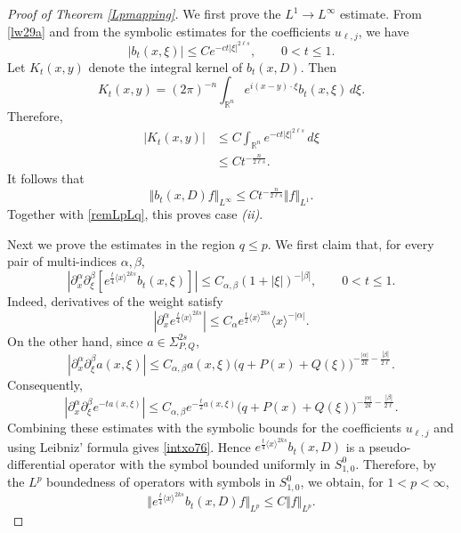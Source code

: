 \documentclass[12pt, reqno]{amsart}
\theoremstyle{definition}
\theoremstyle{remark}
\numberwithin{equation}{section}
\begin{document}
\begin{proof}[Proof of Theorem \ref{Lpmapping}]
We first prove the $L^1\to L^\infty$ estimate. From \eqref{lw29a} and from the symbolic estimates for the coefficients $u_{\ell,j}$, we have
\[
    |b_t(x,\xi)|
    \leq
    C e^{-c t|\xi|^{2\ell s}},
    \qquad 0<t\leq1.
\]
Let $K_t(x,y)$ denote the integral kernel of $b_t(x,D)$. Then
\[
    K_t(x,y)
    =
    (2\pi)^{-n}
    \int_{\mathbb R^n}
    e^{i(x-y)\cdot\xi}
    b_t(x,\xi)\,d\xi .
\]
Therefore,
\[
\begin{aligned}
    |K_t(x,y)|
    &\leq
    C\int_{\mathbb R^n}
    e^{-c t|\xi|^{2\ell s}}\,d\xi          \\
    &\leq
    C t^{-\frac{n}{2\ell s}}.
\end{aligned}
\]
It follows that
\begin{equation}
\label{L1Linf}
    \Vert b_t(x,D)f\Vert_{L^\infty}
    \leq
    C t^{-\frac{n}{2\ell s}}
    \Vert f\Vert_{L^1}.
\end{equation}
Together with \eqref{remLpLq}, this proves case {\it (ii)}.

Next we prove the estimates in the region $q\leq p$. We first claim that, for every pair of multi-indices $\alpha,\beta$,
\begin{equation}
\label{intxo76}
    \left|
    \partial_x^\alpha\partial_\xi^\beta
    \left[
    e^{\frac{t}{4}\langle x\rangle^{2k s}}
    b_t(x,\xi)
    \right]
    \right|
    \leq
    C_{\alpha,\beta}
    (1+|\xi|)^{-|\beta|},
    \qquad 0<t\leq1.
\end{equation}
Indeed, derivatives of the weight satisfy
\[
    \left|
    \partial_x^\alpha
    e^{\frac{t}{4}\langle x\rangle^{2k s}}
    \right|
    \leq
    C_\alpha
    e^{\frac{t}{2}\langle x\rangle^{2k s}}
    \langle x\rangle^{-|\alpha|}.
\]
On the other hand, since $a\in\Sigma_{P,Q}^{2s}$,
\[
    \left|
    \partial_x^\alpha\partial_\xi^\beta a(x,\xi)
    \right|
    \leq
    C_{\alpha,\beta}
    a(x,\xi)
    \big(q+P(x)+Q(\xi)\big)^{
    -\frac{|\alpha|}{2k}
    -\frac{|\beta|}{2\ell}} .
\]
Consequently,
\[
    \left|
    \partial_x^\alpha\partial_\xi^\beta
    e^{-t a(x,\xi)}
    \right|
    \leq
    C_{\alpha,\beta}
    e^{-\frac t2 a(x,\xi)}
    \big(q+P(x)+Q(\xi)\big)^{
    -\frac{|\alpha|}{2k}
    -\frac{|\beta|}{2\ell}} .
\]
Combining these estimates with the symbolic bounds for the coefficients
$u_{\ell,j}$ and using Leibniz' formula gives \eqref{intxo76}. Hence $e^{\frac{t}{4}\langle x\rangle^{2k s}}b_t(x,D)$
is a pseudo-differential operator with the symbol bounded uniformly in
$S_{1,0}^0$. Therefore, by the $L^p$ boundedness of operators with symbols in
$S_{1,0}^0$, we obtain, for $1<p<\infty$,
\begin{equation}
\label{ppCt}
    \Vert
    e^{\frac{t}{4}\langle x\rangle^{2k s}}
    b_t(x,D)f
    \Vert_{L^p}
    \leq
    C\Vert f\Vert_{L^p}.
\end{equation}


\end{proof}
\end{document}
